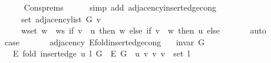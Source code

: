\begin{isabellebody}
\ \ \ \ \isamarkupfalse%
\ Cons{\isachardot}{\kern0pt}prems\isanewline
\ \ \ \ \isamarkupfalse%
\ {\isacharparenleft}{\kern0pt}simp\ add{\isacharcolon}{\kern0pt}\ adjacency{\isacharunderscore}{\kern0pt}insert{\isacharunderscore}{\kern0pt}edge{\isacharunderscore}{\kern0pt}cong{\isacharparenright}{\kern0pt}\isanewline
\ \ \isamarkupfalse%
\ \isamarkupfalse%
\isanewline
\ \ \ \ {\isachardoublequoteopen}{\isachardot}{\kern0pt}{\isachardot}{\kern0pt}{\isachardot}{\kern0pt}\ {\isacharequal}{\kern0pt}\isanewline
\ \ \ \ \ set\ {\isacharparenleft}{\kern0pt}adjacency{\isacharunderscore}{\kern0pt}list\ G\ v{\isacharparenright}{\kern0pt}\ {\isasymunion}\isanewline
\ \ \ \ \ {\isacharparenleft}{\kern0pt}{\isasymUnion}w{\isasymin}set\ {\isacharparenleft}{\kern0pt}w\ {\isacharhash}{\kern0pt}\ ws{\isacharparenright}{\kern0pt}{\isachardot}{\kern0pt}\ if\ v\ {\isacharequal}{\kern0pt}\ u\ then\ {\isacharbraceleft}{\kern0pt}w{\isacharbraceright}{\kern0pt}\ else\ if\ v\ {\isacharequal}{\kern0pt}\ w\ then\ {\isacharbraceleft}{\kern0pt}u{\isacharbraceright}{\kern0pt}\ else\ {\isacharbraceleft}{\kern0pt}{\isacharbraceright}{\kern0pt}{\isacharparenright}{\kern0pt}{\isachardoublequoteclose}\isanewline
\ \ \ \ \isamarkupfalse%
\ auto\isanewline
\ \ \isamarkupfalse%
\ \isamarkupfalse%
\ {\isacharquery}{\kern0pt}case\isanewline
\ \ \ \ \isacommand{{\isachardot}{\kern0pt}}\isamarkupfalse%
\isanewline
{}\isamarkupfalse%
%
\endisatagproof
{\isafoldproof}%
%
\isadelimproof
\isanewline
%
\endisadelimproof
\isanewline
{}\isamarkupfalse%
\ {\isacharparenleft}{\kern0pt}\ adjacency{\isacharparenright}{\kern0pt}\ E{\isacharunderscore}{\kern0pt}fold{\isacharunderscore}{\kern0pt}insert{\isacharunderscore}{\kern0pt}edge{\isacharunderscore}{\kern0pt}cong{\isacharcolon}{\kern0pt}\isanewline
\ \ \ {\isachardoublequoteopen}invar\ G{\isachardoublequoteclose}\isanewline
\ \ \ {\isachardoublequoteopen}E\ {\isacharparenleft}{\kern0pt}fold\ {\isacharparenleft}{\kern0pt}insert{\isacharunderscore}{\kern0pt}edge\ u{\isacharparenright}{\kern0pt}\ l\ G{\isacharparenright}{\kern0pt}\ {\isacharequal}{\kern0pt}\ E\ G\ {\isasymunion}\ {\isacharbraceleft}{\kern0pt}{\isacharbraceleft}{\kern0pt}u{\isacharcomma}{\kern0pt}\ v{\isacharbraceright}{\kern0pt}\ {\isacharbar}{\kern0pt}v{\isachardot}{\kern0pt}\ v\ {\isasymin}\ set\ l{\isacharbraceright}{\kern0pt}{\isachardoublequoteclose}\isanewline
%
\isadelimproof
%
\endisadelimproof

\end{isabellebody}
